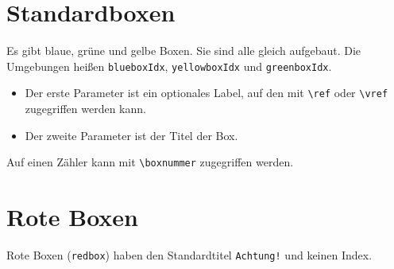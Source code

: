 		\section{Standardboxen}
			Es gibt blaue, grüne und gelbe Boxen. Sie sind alle gleich aufgebaut. Die Umgebungen heißen \verb|blueboxIdx|, \verb|yellowboxIdx| und \verb|greenboxIdx|.
			\begin{itemize}
				\item Der erste Parameter ist ein optionales Label, auf den mit \verb|\ref| oder \verb|\vref| zugegriffen werden kann.
				\item Der zweite Parameter ist der Titel der Box.
			\end{itemize}
			Auf einen Zähler kann mit \verb|\boxnummer| zugegriffen werden. \par
		\newpage
		\section{Rote Boxen}
			Rote Boxen (\verb|redbox|) haben den Standardtitel \texttt{Achtung!} und keinen Index. \par
			
